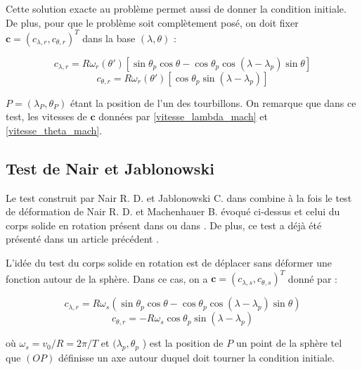 Cette solution exacte au problème permet aussi de donner la condition initiale. De plus, pour que le problème soit complètement posé, on doit fixer $\mathbf{c} = ( c_{\lambda, r} , c_{\theta, r})^T$ dans la base $(\lambda, \theta)$ : 

\begin{equation}
c_{\lambda, r} = R \omega_r ( \theta' ) \left[ \sin \theta_p \cos \theta - \cos \theta_p \cos ( \lambda - \lambda_p ) \sin \theta \right]
\label{vitesse_lambda_mach}
\end{equation}
\begin{equation}
c_{\theta, r} = R \omega_r ( \theta' ) \left[ \cos \theta_p \sin ( \lambda - \lambda_p ) \right]
\label{vitesse_theta_mach}
\end{equation}

$P = ( \lambda_P, \theta_P)$ étant la position de l'un des tourbillons. On remarque que dans ce test, les vitesses de $\mathbf{c}$ données par \eqref{vitesse_lambda_mach} et \eqref{vitesse_theta_mach}.

\subsection{Test de Nair et Jablonowski}

Le test construit par Nair R. D. et Jablonowski C. dans \cite{Nair2008} combine à la fois le test de déformation de Nair R. D. et Machenhauer B. \cite{Nair2001} évoqué ci-dessus et celui du corps solide en rotation présent dans \cite{Nair1999} ou dans \cite{Williamson1994}. De plus, ce test a déjà été présenté dans un article précédent \cite{Croisille2013}. 

L'idée du test du corps solide en rotation est de déplacer sans déformer une fonction autour de la sphère. Dans ce cas, on a $\mathbf{c} = \left( c_{\lambda, s}, c_{\theta, s} \right)^T$ donné par :

\begin{equation}
c_{\lambda, r} = R \omega_s \left( \sin \theta_p \cos \theta - \cos \theta_p \cos ( \lambda - \lambda_p ) \sin \theta \right)
\label{vitesse_lambda_bump}
\end{equation}
\begin{equation}
c_{\theta, r} = - R \omega_s \cos \theta_p \sin ( \lambda - \lambda_p )
\label{vitesse_theta_bump}
\end{equation}

où $\omega_s = v_0 / R = 2 \pi / T $ et $( \lambda_p, \theta_p$ )  est la position de $P$ un point de la sphère tel que $(OP)$ définisse un axe autour duquel doit tourner la condition initiale.


